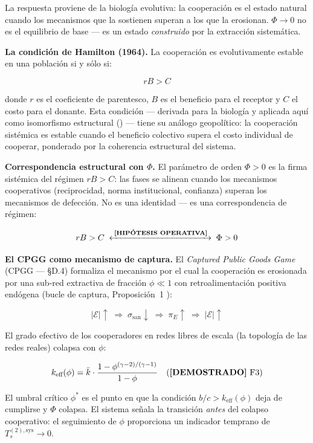 La respuesta proviene de la biolog\'{i}a evolutiva: la cooperaci\'{o}n
es el estado natural cuando los mecanismos que la sostienen superan a los
que la erosionan. \(\Phi \to 0\) no es el equilibrio de base --- es un
estado \emph{construido} por la extracci\'{o}n sistem\'{a}tica.

\Proved{} \textbf{La condici\'{o}n de Hamilton (1964).} La cooperaci\'{o}n
es evolutivamente estable en una poblaci\'{o}n si y s\'{o}lo si:

\[
rB > C \tag{H}
\]

donde \(r\) es el coeficiente de parentesco, \(B\) es el beneficio para
el receptor y \(C\) el costo para el donante. Esta condici\'{o}n ---
derivada para la biolog\'{i}a y aplicada aqu\'{i} como isomorfismo
estructural (\Hypoth{}) --- tiene su an\'{a}logo geopol\'{i}tico: la
cooperaci\'{o}n sist\'{e}mica es estable cuando el beneficio colectivo
supera el costo individual de cooperar, ponderado por la coherencia
estructural del sistema.

\Hypoth{} \textbf{Correspondencia estructural con \(\Phi\).}
El par\'{a}metro de orden \(\Phi > 0\) es la firma sist\'{e}mica del
r\'{e}gimen \(rB > C\): las fases se alinean cuando los mecanismos
cooperativos (reciprocidad, norma institucional, confianza) superan los
mecanismos de defecci\'{o}n. No es una identidad --- es una
correspondencia de r\'{e}gimen:

\[
rB > C \;\xleftrightarrow{\;\text{\textnormal{\textbf{[HIP\'{O}TESIS OPERATIVA]}}{}}\;}\; \Phi > 0
\]

\Hypoth{} \textbf{El CPGG como mecanismo de captura.} El
\textit{Captured Public Goods Game} (CPGG --- §D.4) formaliza el
mecanismo por el cual la cooperaci\'{o}n es erosionada por una sub-red
extractiva de fracci\'{o}n \(\phi \ll 1\) con retroalimentaci\'{o}n
positiva end\'{o}gena (bucle de captura, Proposici\'{o}n~1 \Proved{}):

\[
|\mathcal{E}| \uparrow \;\Rightarrow\; \sigma_{\text{san}} \downarrow \;\Rightarrow\; \pi_E \uparrow \;\Rightarrow\; |\mathcal{E}| \uparrow
\]

El grado efectivo de los cooperadores en redes libres de escala (la
topolog\'{i}a de las redes reales) colapsa con \(\phi\):

\[
k_{\text{eff}}(\phi) = \bar{k} \cdot \frac{1 - \phi^{(\gamma-2)/(\gamma-1)}}{1-\phi} \quad (\text{\textnormal{\textbf{[DEMOSTRADO]}}{} F3})
\]

El umbral cr\'{i}tico \(\phi^*\) es el punto en que la condici\'{o}n
\(b/c > k_{\text{eff}}(\phi)\) deja de cumplirse y \(\Phi\) colapsa.
El sistema se\~{n}ala la transici\'{o}n \emph{antes} del colapso
cooperativo: el seguimiento de \(\phi\) proporciona un indicador temprano
de \(T_s^{(2),\text{sys}} \to 0\).

